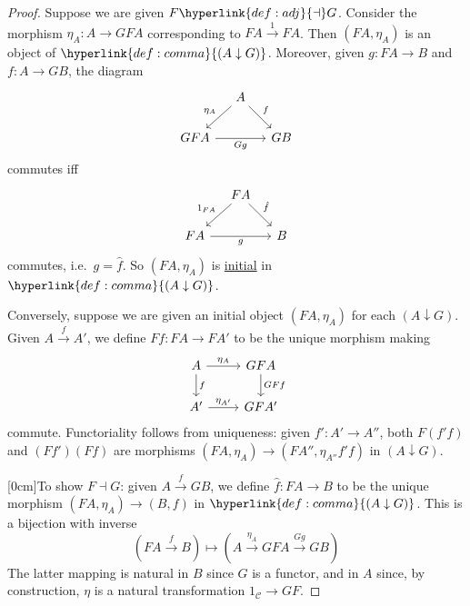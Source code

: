 \documentclass{article}
\let\to\longrightarrow
\let\mapsto\longmapsto
\begin{document}
\begin{proof}
  Suppose we are given $F \hyperlink{def:adj}{\dashv} G$.
  Consider the morphism $\eta_A: A \to GFA$ corresponding to $FA \overset{1}\to FA$.
  Then $(FA, \eta_A)$ is an object of $\hyperlink{def:comma}{(A \downarrow G)}$.
  Moreover, given $g: FA \to B$ and $f: A \to GB$, the diagram
  \begin{equation*}
    \begin{tikzcd}[column sep=small]
      & A \arrow[ld, "\eta_A"'] \arrow[rd, "f"] &  \\
      GFA \arrow[rr, "Gg"'] &  & GB
    \end{tikzcd}
  \end{equation*}
  commutes iff
  \begin{equation*}
    \begin{tikzcd}[column sep=small]
      & FA \arrow[ld, "1_{FA}"'] \arrow[rd, "\hat{f}"] &  \\
      FA \arrow[rr, "g"'] &  & B
    \end{tikzcd}
  \end{equation*}
  commutes, i.e.\ $g = \hat{f}$.
  So $(FA, \eta_A)$ is \hyperlink{def:initial}{initial} in $\hyperlink{def:comma}{(A \downarrow G)}$.

  Conversely, suppose we are given an initial object $(FA, \eta_A)$ for each $(A \downarrow G)$.
  Given $A \overset{f}\to A'$, we define $Ff: FA \to FA'$ to be the unique morphism making
  \begin{equation*}
    \begin{tikzcd}
      A \arrow[d, "f"] \arrow[r, "\eta_A"] & GFA \arrow[d, "GFf"] \\
      A' \arrow[r, "\eta_{A'}"] & GFA'
    \end{tikzcd}
  \end{equation*}
  commute.
  Functoriality follows from uniqueness: given $f': A' \to A''$, both $F(f'f)$ and $(Ff')(Ff)$ are morphisms $(FA, \eta_A) \to (FA'', \eta_{A''}f'f)$ in $(A \downarrow G)$.

  [0cm]To show $F \dashv G$: given $A \overset{f}\to GB$, we define $\hat{f}: FA \to B$ to be the unique morphism $(FA, \eta_A) \to (B, f)$ in $\hyperlink{def:comma}{(A \downarrow G)}$.
  This is a bijection with inverse
  \begin{equation*}
    (FA \overset{f}\to B) \mapsto (A \overset{\eta_A}\to GFA \overset{Gg}\to GB)
  \end{equation*}
  The latter mapping is natural in $B$ since $G$ is a functor, and in $A$ since, by construction, $\eta$ is a natural transformation $1_\mathscr{C} \to GF$.
\end{proof}
\end{document}
